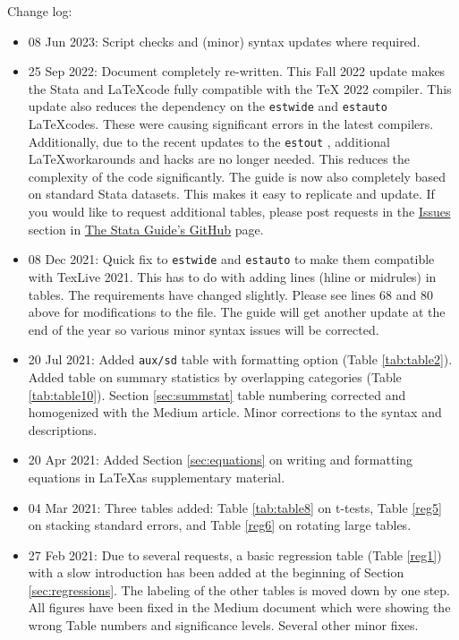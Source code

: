 \documentclass[11pt]{article}
\numberwithin{table}{section}   %
\begin{document}
Change log:
\begin{itemize}
    \item 08 Jun 2023: Script checks and (minor) syntax updates where required.
    \item 25 Sep 2022: Document completely re-written. This Fall 2022 update makes the Stata and \LaTeX code fully compatible with the TeX 2022 compiler. This update also reduces the dependency on the \texttt{estwide} and \texttt{estauto} \LaTeX codes. These were causing significant errors in the latest compilers. Additionally, due to the recent updates to the \texttt{estout} \citep{Jann2007}, additional \LaTeX workarounds and hacks are no longer needed. This reduces the complexity of the code significantly. The guide is now also completely based on standard Stata datasets. This makes it easy to replicate and update. If you would like to request additional tables, please post requests in the \href{https://github.com/asjadnaqvi/The-Stata-Guide/issues}{Issues} section in \href{https://github.com/asjadnaqvi/The-Stata-Guide}{The Stata Guide's GitHub} page.
    \item 08 Dec 2021: Quick fix to \texttt{estwide} and \texttt{estauto} to make them compatible with TexLive 2021. This has to do with adding lines (hline or midrules) in tables. The requirements have changed slightly. Please see lines 68 and 80 above for modifications to the file. The guide will get another update at the end of the year so various minor syntax issues will be corrected.
    \item 20 Jul 2021: Added \texttt{aux/sd} table with formatting option (Table \ref{tab:table2}). Added table on summary statistics by overlapping categories (Table \ref{tab:table10}). Section {\ref{sec:summstat}} table numbering corrected and homogenized with the Medium article. Minor corrections to the syntax and descriptions.
    \item 20 Apr 2021: Added Section \ref{sec:equations} on writing and formatting equations in \LaTeX as supplementary material.
    \item 04 Mar 2021: Three tables added: Table \ref{tab:table8} on t-tests, Table \ref{reg5} on stacking standard errors, and Table \ref{reg6} on rotating large tables.
    \item 27 Feb 2021: Due to several requests, a basic regression table (Table \ref{reg1}) with a slow introduction has been added at the beginning of Section \ref{sec:regressions}. The labeling of the other tables is moved down by one step. All figures have been fixed in the Medium document which were showing the wrong Table numbers and significance levels. Several other minor fixes.

\end{itemize}
\end{document}
